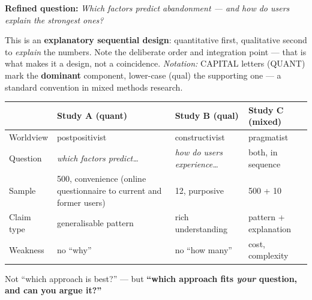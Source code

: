 \documentclass[11pt,a4paper,british,twoside=false,headings=small,chapterprefix=false,numbers=noenddot]{scrbook}
\newenvironment{alertblock}[1]{\begin{tcolorbox}[scriptbox, colframe=uiared, colback=uiamutedred, title={#1}]}{\end{tcolorbox}}
\begin{document}
\begin{center}\small
\small
  \textbf{Refined question:} \emph{Which factors predict abandonment --- and how
  do users explain the strongest ones?}
  \begin{center}
  \end{center}
  
  This is an \textbf{explanatory sequential design}: quantitative first,
  qualitative second to \emph{explain} the numbers. Note the deliberate order
  and integration point --- that is what makes it a design, not a coincidence.
  \emph{Notation:} CAPITAL letters (QUANT) mark the \textbf{dominant} component,
  lower-case (qual) the supporting one --- a standard convention in mixed
  methods research.
\end{center}

\begin{center}\small
\small
  \renewcommand{\arraystretch}{1.3}
  \begin{tabular}{@{}p{2.4cm}p{3.4cm}p{3.4cm}p{3.5cm}@{}}
    \toprule
     & \textbf{Study A (quant)} & \textbf{Study B (qual)} & \textbf{Study C (mixed)}\\
    \midrule
    Worldview   & postpositivist & constructivist & pragmatist\\
    Question    & \emph{which factors predict\dots} & \emph{how do users experience\dots} & both, in sequence\\
    Sample      & 500, convenience (online questionnaire to current and former users) & 12, purposive & 500 + 10\\
    Claim type  & generalisable pattern & rich understanding & pattern + explanation\\
    Weakness    & no ``why'' & no ``how many'' & cost, complexity\\
    \bottomrule
  \end{tabular}
  

  \begin{alertblock}{The essay question behind every essay}
    Not ``which approach is best?'' --- but
    \textbf{``which approach fits \emph{your} question, and can you argue it?''}
  \end{alertblock}
\end{center}
\end{document}
